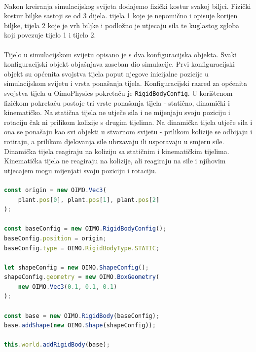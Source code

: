 \documentclass[times, utf8, diplomski]{fer}
\begin{document}
\paragraph{}
Nakon kreiranja simulacijskog svijeta dodajemo fizički kostur svakoj biljci. Fizički kostur 
biljke sastoji se od 3 dijela. tijela 1 koje je nepomično i opisuje korijen biljke, tijela 2 
koje je vrh biljke i podložno je utjecaju sila te kuglastog zgloba koji povezuje tijelo 1 i
tijelo 2.

\paragraph{}
Tijelo u simulacijskom svijetu opisano je s dva konfiguracijska objekta. Svaki 
konfiguracijski objekt objašnjava zaseban dio simulacije. Prvi konfiguracijski objekt su
općenita svojstva tijela poput njegove inicijalne pozicije u simulacijskom svijetu i vrsta
ponašanja tijela. Konfiguracijski razred za općenita svojstva tijela u OimoPhysics pokretaču 
je \verb#RigidBodyConfig#. U korištenom fizičkom pokretaču postoje tri vrste
ponašanja tijela - statično, dinamički i kinematičko. Na statična tijela ne utječe sila i 
ne mijenjaju svoju poziciju i rotaciju čak ni prilikom kolizije s drugim tijelima. Na 
dinamička tijela utječe sila i ona se ponašaju kao svi objekti u stvarnom svijetu - prilikom 
kolizije se odbijaju i rotiraju, a prilikom djelovanja sile ubrzavaju ili usporavaju u 
smjeru sile. Dinamička tijela reagiraju na koliziju sa statičnim i kinematičkim tijelima. 
Kinematička tijela ne reagiraju na kolizije, ali reagiraju na sile i njihovim utjecajem mogu 
mijenjati svoju poziciju i rotaciju.
\paragraph{}

\begin{lstlisting}[language=Javascript, caption=Postavljanje tijela korijena biljke i njegovih svojstava,label=code33-2]
const origin = new OIMO.Vec3(
	plant.pos[0], plant.pos[1], plant.pos[2]
);

const baseConfig = new OIMO.RigidBodyConfig();
baseConfig.position = origin;
baseConfig.type = OIMO.RigidBodyType.STATIC;

let shapeConfig = new OIMO.ShapeConfig();
shapeConfig.geometry = new OIMO.BoxGeometry(
	new OIMO.Vec3(0.1, 0.1, 0.1)
);

const base = new OIMO.RigidBody(baseConfig);
base.addShape(new OIMO.Shape(shapeConfig));

this.world.addRigidBody(base);
\end{lstlisting}
\end{document}
